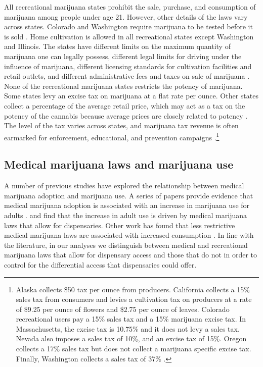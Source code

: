 \documentclass[12pt]{article}%
\begin{document}
All recreational marijuana states prohibit the sale, purchase, and consumption of marijuana among people under age 21. However, other details of the laws vary across states. Colorado and Washington require marijuana to be tested before it is sold \citep{ThePolicySurveillanceProgram2015}. Home cultivation is allowed in all recreational states except Washington and Illinois. The states have different limits on the maximum quantity of marijuana one can legally possess, different legal limits for driving under the influence of marijuana, different licensing standards for cultivation facilities and retail outlets, and different administrative fees and taxes on sale of marijuana \citep{ThePolicySurveillanceProgram2015}. None of the recreational marijuana states restricts the potency of marijuana. Some states levy an excise tax on marijuana at a flat rate per ounce. Other states collect a percentage of the average retail price, which may act as a tax on the potency of the cannabis because average prices are closely related to potency \citep{Hanson2015}. The level of the tax varies across states, and marijuana tax revenue is often earmarked for enforcement, educational, and prevention campaigns \citep{Hanson2015, Hansen2017}.\footnote{Alaska collects \$50 tax per ounce from producers. California collects a 15\% sales tax from consumers and levies a cultivation tax on producers at a rate of \$9.25 per ounce of flowers and \$2.75 per ounce of leaves. Colorado recreational users pay a 15\% sales tax and a 15\% marijuana excise tax. In Massachusetts, the excise tax is 10.75\% and it does not levy a sales tax. Nevada also imposes a sales tax of 10\%, and an excise tax of 15\%. Oregon collects a 17\% sales tax but does not collect a marijuana specific excise tax. Finally, Washington collects a sales tax of 37\% \citep{TaxFoundation2018}.}


\subsection{Medical marijuana laws and marijuana use}\label{sec:mml_related_research}

A number of previous studies have explored the relationship between medical marijuana adoption and marijuana use. 
A series of papers provide evidence that medical marijuana adoption is associated with an increase in marijuana use for adults \citep{Cerda2012, Martins2016, WEN201564}. 
\citet{Pacula2015} and \citet{Hasin2017} find that the increase in adult use is driven by medical marijuana laws that allow for dispensaries. 
Other work has found that less restrictive medical marijuana laws are associated with increased consumption  \citep{Anderson2013,Smart2015,Sabia2017,Powell2018}. 
In line with the literature, in our analyses we distinguish between medical and recreational marijuana laws that allow for dispensary access and those that do not in order to control for the differential access that dispensaries could offer. 
\end{document}
